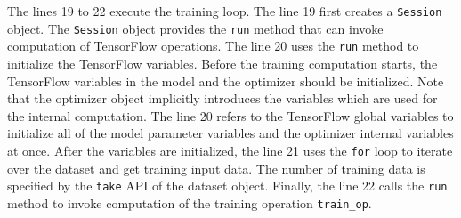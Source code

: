 The lines 19 to 22 execute the training loop. 
The line 19 first creates a {\tt Session} object.
The {\tt Session} object provides the {\tt run} method that can invoke
computation of TensorFlow operations.
The line 20 uses the {\tt run} method to initialize the TensorFlow variables.
Before the training computation starts,
the TensorFlow variables in the model and the optimizer should be initialized.
Note that the optimizer object implicitly introduces the variables which are 
used for the internal computation.
The line 20 refers to the TensorFlow global variables to initialize
all of the model parameter variables and the optimizer internal variables
at once.
After the variables are initialized, the line 21 uses the {\tt for} loop
to iterate over the dataset and get training input data. 
The number of training data is specified by the {\tt take} API of the
dataset object.
Finally, the line 22 calls the {\tt run} method to
invoke computation of the training operation {\tt train\_op}.
